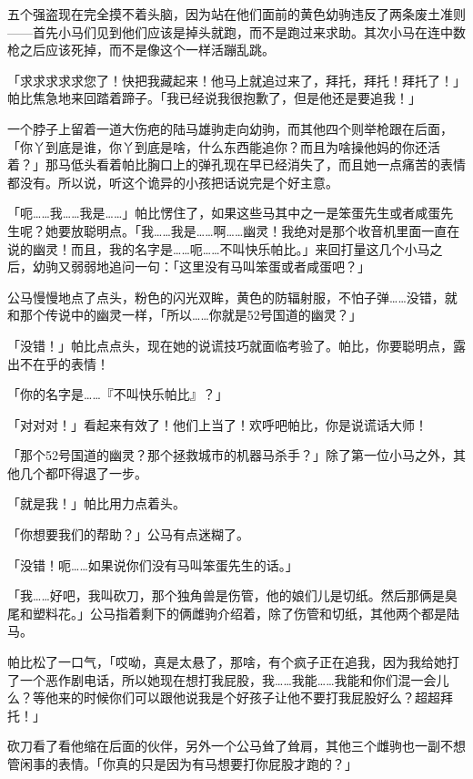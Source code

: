 \horizonline


五个强盗现在完全摸不着头脑，因为站在他们面前的黄色幼驹违反了两条废土准则——首先小马们见到他们应该是掉头就跑，而不是跑过来求助。其次小马在连中数枪之后应该死掉，而不是像这个一样活蹦乱跳。

「求求求求求您了！快把我藏起来！他马上就追过来了，拜托，拜托！拜托了！」帕比焦急地来回踏着蹄子。「我已经说我很抱歉了，但是他还是要追我！」

一个脖子上留着一道大伤疤的陆马雄驹走向幼驹，而其他四个则举枪跟在后面，「你丫到底是谁，你丫到底是啥，什么东西能追你？而且为啥操他妈的你还活着？」那马低头看着帕比胸口上的弹孔现在早已经消失了，而且她一点痛苦的表情都没有。所以说，听这个诡异的小孩把话说完是个好主意。

「呃……我……我是……」帕比愣住了，如果这些马其中之一是笨蛋先生或者咸蛋先生呢？她要放聪明点。「我……我是……啊……幽灵！我绝对是那个收音机里面一直在说的幽灵！而且，我的名字是……呃……不叫快乐帕比。」来回打量这几个小马之后，幼驹又弱弱地追问一句：「这里没有马叫笨蛋或者咸蛋吧？」

公马慢慢地点了点头，粉色的闪光双眸，黄色的防辐射服，不怕子弹……没错，就和那个传说中的幽灵一样，「所以……你就是52号国道的幽灵？」

「没错！」帕比点点头，现在她的说谎技巧就面临考验了。帕比，你要聪明点，露出不在乎的表情！

「你的名字是……『不叫快乐帕比』？」

「对对对！」看起来有效了！他们上当了！欢呼吧帕比，你是说谎话大师！

「那个52号国道的幽灵？那个拯救城市的机器马杀手？」除了第一位小马之外，其他几个都吓得退了一步。

「就是我！」帕比用力点着头。

「你想要我们的帮助？」公马有点迷糊了。

「没错！呃……如果说你们没有马叫笨蛋先生的话。」

「我……好吧，我叫砍刀，那个独角兽是伤管，他的娘们儿是切纸。然后那俩是臭尾和塑料花。」公马指着剩下的俩雌驹介绍着，除了伤管和切纸，其他两个都是陆马。

帕比松了一口气，「哎呦，真是太悬了，那啥，有个疯子正在追我，因为我给她打了一个恶作剧电话，所以她现在想打我屁股，我……我能……我能和你们混一会儿么？等他来的时候你们可以跟他说我是个好孩子让他不要打我屁股好么？超超拜托！」

砍刀看了看他缩在后面的伙伴，另外一个公马耸了耸肩，其他三个雌驹也一副不想管闲事的表情。「你真的只是因为有马想要打你屁股才跑的？」

